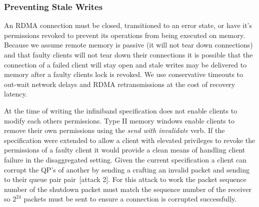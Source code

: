 \subsubsection{Preventing Stale Writes}
\label{sec:stale-writes}

An RDMA connection must be closed, transitioned to an error
state, or have it's permissions revoked to prevent its
operations from being executed on memory. Because we assume
remote memory is passive (it will not tear down connections)
and that faulty clients will not tear down their connections
it is possible that the connection of a failed client will
stay open and stale writes may be delivered to memory after
a faulty clients lock is revoked. We use conservative
timeouts to out-wait network delays and RDMA retransmissions
at the cost of recovery latency. 

At the time of writing the infiniband specification does not
enable clients to modify each others permissions. Type II
memory windows enable clients to remove their own
permissions using the \textit{send with invalidate} verb. If
the specification were extended to allow a client with
elevated privileges to revoke the permissions of a faulty
client it would provide a clean means of handling client
failure in the disaggregated setting. Given the current
specification a client can corrupt the QP's of another by
sending a crafting an invalid packet and sending to their
queue pair pair~\cite{redmark}[attack 2]. For this attack to
work the packet sequence number of the shutdown packet must
match the sequence number of the receiver so $2^{24}$
packets must be sent to ensure a connection is corrupted
successfully.
